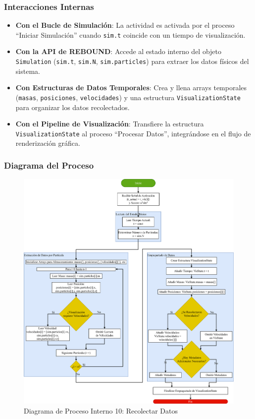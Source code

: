\subsubsection{Interacciones Internas}
\begin{itemize}
    \item \textbf{Con el Bucle de Simulación}: La actividad es activada por el proceso ``Iniciar Simulación'' cuando \texttt{sim.t} coincide con un tiempo de visualización.
    \item \textbf{Con la API de REBOUND}: Accede al estado interno del objeto \texttt{Simulation} (\texttt{sim.t}, \texttt{sim.N}, \texttt{sim.particles}) para extraer los datos físicos del sistema.
    \item \textbf{Con Estructuras de Datos Temporales}: Crea y llena arrays temporales (\texttt{masas}, \texttt{posiciones}, \texttt{velocidades}) y una estructura \texttt{VisualizationState} para organizar los datos recolectados.
    \item \textbf{Con el Pipeline de Visualización}: Transfiere la estructura \texttt{VisualizationState} al proceso ``Procesar Datos'', integrándose en el flujo de renderización gráfica.
\end{itemize}

\subsubsection{Diagrama del Proceso}
\begin{figure}[H]
    \centering
    \includegraphics[width=\textwidth]{img/Analisis/DiagramaProcesos/DiagramaProceso10_RecolectarDatos.png}
    \caption{Diagrama de Proceso Interno 10: Recolectar Datos}%
    \label{fig:process_diagram10}
\end{figure}